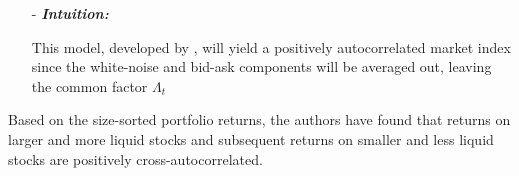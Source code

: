 \begin{enumerate}
\begin{enumerate}
        \item[-] \textbf{\textit{Intuition:}}
        
        This model, developed by \citet{roll1984simple}, will yield a positively autocorrelated market index since the white-noise and bid-ask components will be averaged out, leaving
        the common factor $\Lambda_t$
    \end{enumerate}
\end{enumerate}

Based on the size-sorted portfolio returns, the authors have found that returns on larger and more liquid stocks 
and subsequent returns on smaller and less liquid stocks are positively cross-autocorrelated. 



